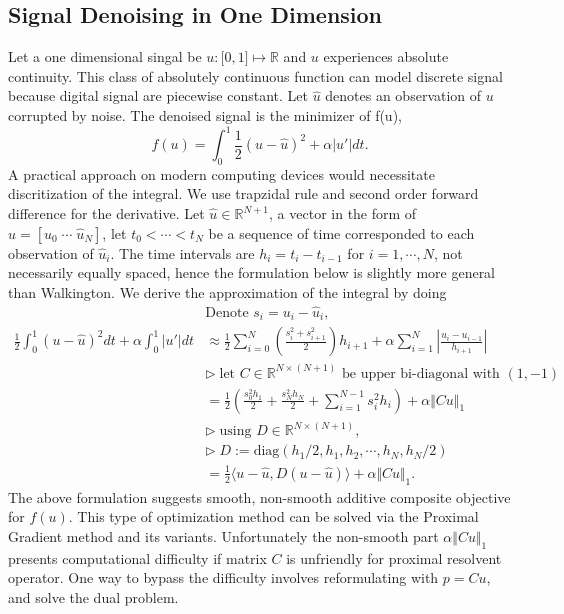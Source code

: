 \documentclass[]{article}
\theoremstyle{definition}
\numberwithin{equation}{subsection}
\begin{document}
    \subsection{Signal Denoising in One Dimension}
        Let a one dimensional singal be $u: \mathbb [0, 1]\mapsto \mathbb R$ and $u$ experiences absolute continuity. 
        This class of absolutely continuous function can model discrete signal because digital signal are piecewise constant. 
        Let $\hat u$ denotes an observation of $u$ corrupted by noise. 
        The denoised signal is the minimizer of f(u),
        \[
            f(u) = \int_0^1 \frac{1}{2} 
            (u - \hat u)^2 + \alpha |u'|dt. 
        \]
        A practical approach on modern computing devices would necessitate discritization of the integral. 
        We use trapzidal rule and second order forward difference for the derivative. 
        Let $\hat u \in \mathbb R^{N+1}$, a vector in the form of $\hat u = [\hat u_0\; \cdots \; \hat u_{N}]$, let $t_0<  \cdots <t_N$ be a sequence of time corresponded to each observation of $\hat u_i$. 
        The time intervals are $h_i = t_{i} - t_{i-1}$ for $i=1, \cdots, N$, not necessarily equally spaced, hence the formulation below is slightly more general than Walkington\cite{noel_nesterovs_nodate}. 
        We derive the approximation of the integral by doing
        \begin{align*}
            & \text{Denote } s_i = u_i - \hat u_i, 
            \\
            \frac{1}{2}\int_{0}^{1} (u - \hat u)^2 dt + 
            \alpha \int_0^1 |u'| dt
            &\approx
            \frac{1}{2}
            \sum_{i = 0}^{N}
            \left(
                \frac{s_i^2 + s_{i + 1}^2}{2}
            \right)h_{i + 1}
            + 
            \alpha
            \sum_{i = 1}^{N}
            \left|
                \frac{u_{i} - u_{i - 1}}{h_{i + 1}}
            \right|
            \\
            & \triangleright\; \text{let } 
            C\in \mathbb R^{N\times (N + 1)} \text{ be upper bi-diagonal with }(1, -1)
            \\
            &= \frac{1}{2}\left(
                \frac{s_0^2h_1}{2} + \frac{s_N^2h_N}{2}
                + 
                \sum_{i = 1}^{N - 1}s_i^2 h_i
            \right) + \alpha\Vert Cu\Vert_1
            \\
            & 
            \triangleright \; \text{using } D\in \mathbb R^{N \times (N + 1)},
            \\
            & \triangleright\; D := \text{diag}(h_1/2, h_1, h_2, \cdots, h_N, h_N/2)
            \\
            &= 
            \frac{1}{2}\langle u - \hat u, D(u - \hat u)\rangle + \alpha \Vert Cu\Vert_1. 
        \end{align*}
    The above formulation suggests smooth, non-smooth additive composite objective for $f(u)$. 
    This type of optimization method can be solved via the Proximal Gradient method and its variants. 
    Unfortunately the non-smooth part $\alpha\Vert Cu\Vert_1$ presents computational difficulty if matrix $C$ is unfriendly for proximal resolvent operator. 
    One way to bypass the difficulty involves reformulating with $p = Cu$, and solve the dual problem. 
\end{document}
